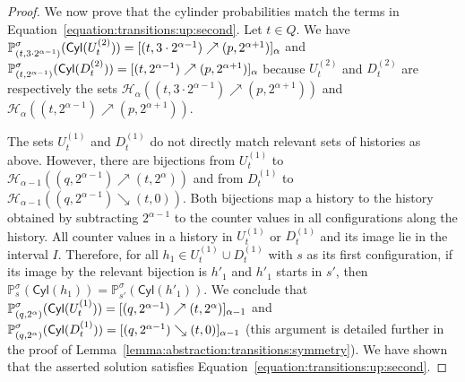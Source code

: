 \documentclass[a4paper,UKenglish,cleveref,autoref,thm-restate,colorlinks]{lipics-v2021}
\newcommand{\proba}{\mathbb{P}}
\newcommand{\cyl}[1]{\mathsf{Cyl}(#1)}
\newcommand{\histPart}{\mathcal{H}}
\newcommand{\hist}{h}
\newcommand{\ocStateSpace}{Q}
\newcommand{\ocState}{q}
\newcommand{\ocStateB}{p}
\newcommand{\ocStateC}{t}
\newcommand{\ocConfig}{s}
\newcommand{\interval}{I}
\newcommand{\powerIndex}{\alpha}
\newcommand{\upProba}[5]{[(#1,#2)\nearrow{}(#3,#4)]_{#5}}
\newcommand{\downProba}[5]{[(#1,#2)\searrow{}(#3,#4)]_{#5}}
\newcommand{\upHistSet}[5]{\histPart_{#5}((#1,#2)\nearrow{}(#3,#4))}
\newcommand{\downHistSet}[5]{\histPart_{#5}((#1,#2)\searrow{}(#3,#4))}
\newcommand{\upPart}[1]{U_{#1}}
\newcommand{\downPart}[1]{D_{#1}}
\newcommand{\stratGeneric}[1]{{\sigma_{#1}}}
\newcommand{\strat}{\stratGeneric{}}
\begin{document}
\begin{proof}
  We now prove that the cylinder probabilities match the terms in Equation~\eqref{equation:transitions:up:second}.
  Let $\ocStateC\in\ocStateSpace$.
  We have
  $\probaG{(\ocStateC, 3\cdot 2^{\powerIndex-1})}{\strat}(\cyl{\upPart{\ocStateC}^{(2)}}) =
  \upProba{\ocStateC}{3\cdot 2^{\powerIndex-1}}{\ocStateB}{2^{\powerIndex+1}}{\powerIndex}$ and
  $\probaG{(\ocStateC, 2^{\powerIndex-1})}{\strat}(\cyl{\downPart{\ocStateC}^{(2)}}) =
  \upProba{\ocStateC}{2^{\powerIndex-1}}{\ocStateB}{2^{\powerIndex+1}}{\powerIndex}$
  because $\upPart{\ocStateC}^{(2)}$ and $\downPart{\ocStateC}^{(2)}$ are respectively the sets $\upHistSet{\ocStateC}{3\cdot 2^{\powerIndex-1}}{\ocStateB}{2^{\powerIndex+1}}{\powerIndex}$ and
  $\upHistSet{\ocStateC}{2^{\powerIndex-1}}{\ocStateB}{2^{\powerIndex+1}}{\powerIndex}$.

  The sets $\upPart{\ocStateC}^{(1)}$ and $\downPart{\ocStateC}^{(1)}$ do not directly match relevant sets of histories as above.
  However, there are bijections from $\upPart{\ocStateC}^{(1)}$ to $\upHistSet{\ocState}{2^{\powerIndex-1}}{\ocStateC}{2^\powerIndex}{\powerIndex-1}$ and from $\downPart{\ocStateC}^{(1)}$ to $\downHistSet{\ocState}{2^{\powerIndex-1}}{\ocStateC}{0}{\powerIndex-1}$.
  Both bijections map a history to the history obtained by subtracting $2^{\powerIndex-1}$ to the counter values in all configurations along the history.
  All counter values in a history in $\upPart{\ocStateC}^{(1)}$ or $\downPart{\ocStateC}^{(1)}$ and its image lie in the interval $\interval$.
  Therefore, for all $\hist_1\in\upPart{\ocStateC}^{(1)}\cup\downPart{\ocStateC}^{(1)}$ with $\ocConfig$ as its first configuration, if its image by the relevant bijection is $\hist'_1$ and $\hist'_1$ starts in $\ocConfig'$, then $\proba^{\strat}_{\ocConfig}(\cyl{\hist_1}) = \proba^{\strat}_{\ocConfig'}(\cyl{\hist'_1})$.
  We conclude that
  $\probaG{(\ocState, 2^{\powerIndex})}{\strat}(\cyl{\upPart{\ocStateC}^{(1)}}) =
  \upProba{\ocState}{2^{\powerIndex-1}}{\ocStateC}{2^{\powerIndex}}{\powerIndex-1}$ and
  $\probaG{(\ocState, 2^\powerIndex)}{\strat}(\cyl{\downPart{\ocStateC}^{(1)}}) =
  \downProba{\ocState}{2^{\powerIndex-1}}{\ocStateC}{0}{\powerIndex-1}$ (this argument is detailed further in the proof of Lemma~\ref{lemma:abstraction:transitions:symmetry}).
  We have shown that the asserted solution satisfies Equation~\eqref{equation:transitions:up:second}.
  

\end{proof}
\end{document}
